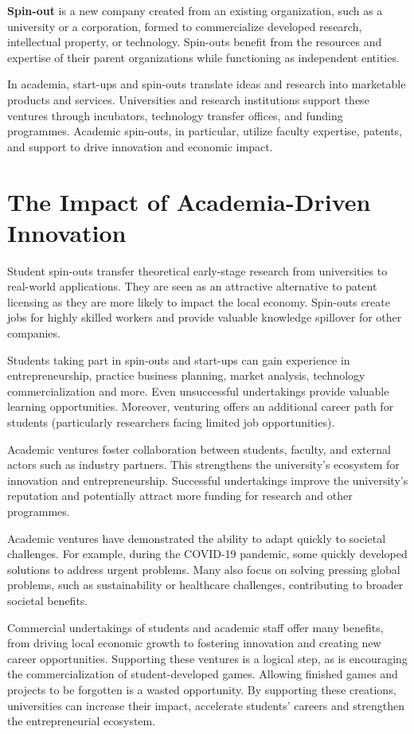 \textbf{Spin-out} is a new company created from an existing organization, such as a university or a corporation, formed to commercialize developed research, intellectual property, or technology. Spin-outs benefit from the resources and expertise of their parent organizations while functioning as independent entities.

In academia, start-ups and spin-outs translate ideas and research into marketable products and services. Universities and research institutions support these ventures through incubators, technology transfer offices, and funding programmes. Academic spin-outs, in particular, utilize faculty expertise, patents, and support to drive innovation and economic impact.

\section{The Impact of Academia-Driven Innovation}
Student spin-outs transfer theoretical early-stage research from universities to real-world applications. They are seen as an attractive alternative to patent licensing as they are more likely to impact the local economy. Spin-outs create jobs for highly skilled workers and provide valuable knowledge spillover for other companies.

Students taking part in spin-outs and start-ups can gain experience in entrepreneurship, practice business planning, market analysis, technology commercialization and more. Even unsuccessful undertakings provide valuable learning opportunities. Moreover, venturing offers an additional career path for students (particularly researchers facing limited job opportunities).

Academic ventures foster collaboration between students, faculty, and external actors such as industry partners. This strengthens the university's ecosystem for innovation and entrepreneurship. Successful undertakings improve the university's reputation and potentially attract more funding for research and other programmes.

Academic ventures have demonstrated the ability to adapt quickly to societal challenges. For example, during the COVID-19 pandemic, some quickly developed solutions to address urgent problems. Many also focus on solving pressing global problems, such as sustainability or healthcare challenges, contributing to broader societal benefits.

Commercial undertakings of students and academic staff offer many benefits, from driving local economic growth to fostering innovation and creating new career opportunities. Supporting these ventures is a logical step, as is encouraging the commercialization of student-developed games. Allowing finished games and projects to be forgotten is a wasted opportunity. By supporting these creations, universities can increase their impact, accelerate students' careers and strengthen the entrepreneurial ecosystem.

